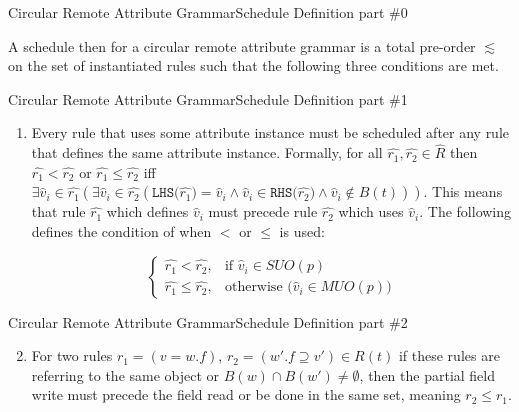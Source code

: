 \begin{frame}{Circular Remote Attribute Grammar}{Schedule Definition part \#0}
    
    \begin{definition}
A schedule then for a circular remote attribute grammar is a \alert{total pre-order} $\lesssim$ on the set of instantiated rules such that the following three conditions are met.
\end{definition}
    
\end{frame}

\begin{frame}{Circular Remote Attribute Grammar}{Schedule Definition part \#1}
    
    \begin{definition}
\begin{enumerate}
\setcounter{enumi}{0}
  \item Every rule that uses some attribute instance must be scheduled after any rule that defines the same attribute instance. Formally, for all $\hat{r_1}, \hat{r_2} \in \hat R$ then $\hat{r_1} < \hat{r_2}$ or $\hat{r_1} \leq \hat{r_2}$ iff $\exists \hat{v}_i \in \hat{r_1} (\exists \hat{v}_i \in \hat{r_2} (\texttt{LHS($\hat{r_1}$)} = \hat{v}_i \wedge \hat{v}_i \in \texttt{RHS($\hat{r_2}$)}   \wedge \hat{v}_i \notin B(t) ))$. This means that rule $\hat{r_1}$ which defines $\hat{v}_i$ must precede rule $\hat{r_2}$ which uses $\hat{v}_i$. The following defines the condition of when $<$ or $\leq$ is used:

    \[ \begin{cases}
      \hat{r_1} < \hat{r_2},    & \text{if } \hat{v}_i \in \mathit{SUO}(p) \\
      \hat{r_1} \leq \hat{r_2}, & \text{otherwise (} \hat{v}_i \in \mathit{MUO}(p)  \text{)}     
    \end{cases} \]
\end{enumerate}
\end{definition}
    
\end{frame}

\begin{frame}{Circular Remote Attribute Grammar}{Schedule Definition part \#2}
\begin{definition}

\begin{enumerate}
\setcounter{enumi}{1}
  \item For two rules $r_1 = (v = w.f)$, $r_2 = (w'.f \supseteq v' ) \in R(t)$ if these rules are referring to the same object or $B(w) \cap B(w') \neq \emptyset$, then the partial field write must precede the field read or be done in the same set, meaning $r_2 \leq r_1$.
\end{enumerate}
\end{definition}
\end{frame}

